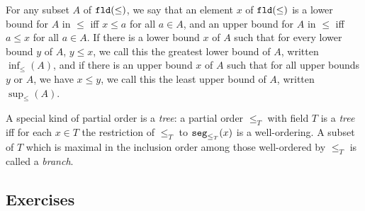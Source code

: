 \documentclass[12pt]{book}
\begin{document}
For any subset $A$ of ${\tt fld}(\leq)$, we say that an element $x$ of
${\tt fld}(\leq)$ is a lower bound for $A$ in $\leq$ iff $x \leq a$
for all $a \in A$, and an upper bound for $A$ in $\leq$ iff $a \leq x$
for all $a \in A$.  If there is a lower bound $x$ of $A$ such that for
every lower bound $y$ of $A$, $y \leq x$, we call this the greatest
lower bound of $A$, written $\inf_{\leq}(A)$, and if there is an upper
bound $x$ of $A$ such that for all upper bounds $y$ or $A$, we have $x
\leq y$, we call this the least upper bound of $A$, written
$\sup_{\leq}(A)$.

A special kind of partial order is a {\em tree}: a partial order
$\leq_T$ with field $T$ is a {\em tree\/} iff for each $x \in T$ the
restriction of $\leq_T$ to ${\tt seg}_{\leq_T}(x)$ is a well-ordering.
A subset of $T$ which is maximal in the inclusion order among those
well-ordered by $\leq_T$ is called a {\em branch\/}.

\newpage

\subsection{Exercises}
\end{document}
